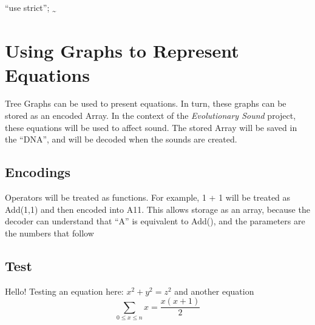 \documentclass[]{article}
\date{}
\begin{document}
``use strict''; \textsubscript{\textasciitilde{}}

\section{Using Graphs to Represent
Equations}\label{using-graphs-to-represent-equations}

Tree Graphs can be used to present equations. In turn, these graphs can
be stored as an encoded Array. In the context of the \emph{Evolutionary
Sound} project, these equations will be used to affect sound. The stored
Array will be saved in the ``DNA'', and will be decoded when the sounds
are created.

\subsection{Encodings}\label{encodings}

Operators will be treated as functions. For example, 1 + 1 will be
treated as Add(1,1) and then encoded into A11. This allows storage as an
array, because the decoder can understand that ``A'' is equivalent to
Add(), and the parameters are the numbers that follow

\subsection{Test}\label{test}

Hello! Testing an equation here: \(x^2 + y^2 = z^2\) and another
equation \[\sum_{0 \leq x \leq n} {x} = \frac{x(x+1)}{2}\]
\end{document}
